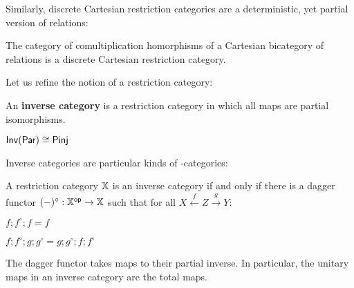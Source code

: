 %
%
Similarly, discrete Cartesian restriction categories are a deterministic, yet partial version of relations:
\begin{lemma}
The category of comultiplication homorphisms of a Cartesian bicategory of relations is a discrete Cartesian restriction category.
\end{lemma}
Let us refine the notion of a restriction category:
\begin{definition}
An {\bf inverse category} is a restriction category in which all maps are partial isomorphisms.
\end{definition}
\begin{example}
$\mathsf{Inv}(\mathsf{Par})\cong\mathsf{Pinj}$
\end{example}
Inverse categories are particular kinds of \dag-categories:
\begin{theorem}
A restriction category $\mathbb{X}$ is an inverse category if and only if there is a dagger functor $(-)^\circ:\mathbb{X}^{\mathsf{op}}\to\mathbb{X}$ such that for all $X\xleftarrow{f} Z \xrightarrow{g} Y$:


\hfil
\begin{minipage}{12cm}
\begin{multicols}{2}
\begin{enumerate}[label={\bf [INV.\arabic*]}, ref={\bf [INV.\arabic*]}]
\item $f; f^\circ ; f = f$
\label{INV.1}
\item $f ; f ^\circ ;g; g^\circ = g;g^\circ ; f; f ^\circ $
\label{INV.2}
\end{enumerate}
\end{multicols}
\end{minipage}

\end{theorem}
The dagger functor takes maps to their partial inverse.
In particular, the unitary maps in an inverse category are the total maps.


